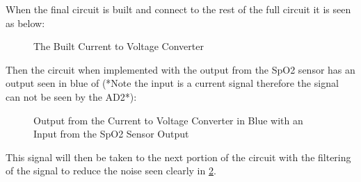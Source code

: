 \documentclass{article}
\begin{document}
When the final circuit is built and connect to the rest of the full circuit it is seen as below:
\begin{figure}[h]
    \centering
    \caption{The Built Current to Voltage Converter}
    \label{figure:BuiltCtoVCircuit}
\end{figure}
\newpage

Then the circuit when implemented with the output from the SpO2 sensor has an output seen in blue of (*Note the input is a current signal therefore the signal can not be seen by the AD2*):
\begin{figure}[h]
    \centering
    \caption{Output from the Current to Voltage Converter in Blue with an Input from the SpO2 Sensor Output}
    \label{figure:CtoVBuiltOutputFromSpO2Sensor}
\end{figure}

This signal will then be taken to the next portion of the circuit with the filtering of the signal to reduce the noise seen clearly in \ref{figure:CtoVBuiltOutputFromSpO2Sensor}.
\newpage
\end{document}
